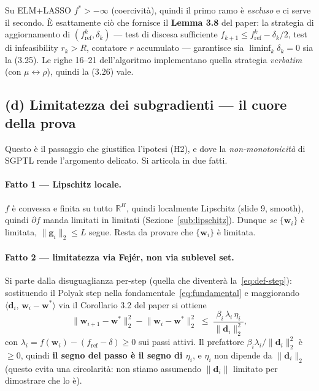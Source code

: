 \documentclass[11pt,a4paper]{article}
\theoremstyle{definition}
\newcommand{\w}{\bm{w}}
\newcommand{\g}{\bm{g}}
\newcommand{\dvec}{\bm{d}}
\newcommand{\wstar}{\w^{*}}
\newcommand{\fstar}{f^{*}}
\newcommand{\fref}{f_{\mathrm{ref}}}
\newcommand{\inner}[2]{\langle #1,\, #2\rangle}
\newcommand{\norm}[1]{\lVert #1\rVert}
\newcommand{\R}{\mathbb{R}}
\begin{document}
Su ELM+LASSO $\fstar>-\infty$ (coercività), quindi il primo ramo è \emph{escluso} e ci serve
il secondo. È esattamente ciò che fornisce il \textbf{Lemma 3.8} del paper: la strategia di
aggiornamento di $(f^k_{\mathrm{ref}},\delta_k)$ --- test di discesa sufficiente
$f_{k+1}\le f^k_{\mathrm{ref}}-\delta_k/2$, test di infeasibility $r_k>R$, contatore
$r$ accumulato --- garantisce sia $\liminf_k\delta_k=0$ sia la (3.25). Le righe 16--21
dell'algoritmo implementano quella strategia \emph{verbatim} (con $\mu\leftrightarrow\rho$),
quindi la (3.26) vale.

\subsection{(d) Limitatezza dei subgradienti --- il cuore della prova}
\label{sec:prova-bounded}

Questo è il passaggio che giustifica l'ipotesi (H2), e dove la \emph{non-monotonicità} di
SGPTL rende l'argomento delicato. Si articola in due fatti.

\paragraph{Fatto 1 --- Lipschitz locale.} $f$ è convessa e finita su tutto $\R^H$, quindi
localmente Lipschitz (slide 9, smooth), quindi $\partial f$ manda limitati in limitati
(Sezione~\ref{sub:lipschitz}). Dunque \emph{se} $\{\w_i\}$ è limitata, $\norm{\g_i}_2\le L$
segue. Resta da provare che $\{\w_i\}$ è limitata.

\paragraph{Fatto 2 --- limitatezza via Fej\'er, non via sublevel set.} Si parte dalla
disuguaglianza per-step (quella che diventerà la~\eqref{eq:def-step}): sostituendo il Polyak
step nella fondamentale~\eqref{eq:fundamental} e maggiorando $\inner{\dvec_i}{\w_i-\wstar}$ via
il Corollario 3.2 del paper si ottiene
\[
\norm{\w_{i+1}-\wstar}_2^2 - \norm{\w_i-\wstar}_2^2 \;\le\; \frac{\beta_i\,\lambda_i\,\eta_i}{\norm{\dvec_i}_2^2},
\]
con $\lambda_i=f(\w_i)-(\fref-\delta)\ge0$ sui passi attivi. Il prefattore
$\beta_i\lambda_i/\norm{\dvec_i}_2^2$ è $\ge0$, quindi \textbf{il segno del passo è il segno di
$\eta_i$}, e $\eta_i$ non dipende da $\norm{\dvec_i}_2$ (questo evita una circolarità: non
stiamo assumendo $\norm{\dvec_i}$ limitato per dimostrare che lo è).
\end{document}
